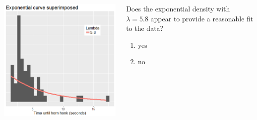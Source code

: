 \begin{frame}
\frametitle{\grp}
\begin{columns}
\includegraphics[width=1.0\textwidth]{Figures/motorists_exp.png}
\begin{clicker}{Does the exponential density with $\lambda=5.8$ appear to provide a reasonable fit to the data?}
\begin{enumerate}
\item yes
\item no
\end{enumerate}
\end{clicker}
\end{columns}
\end{frame}


